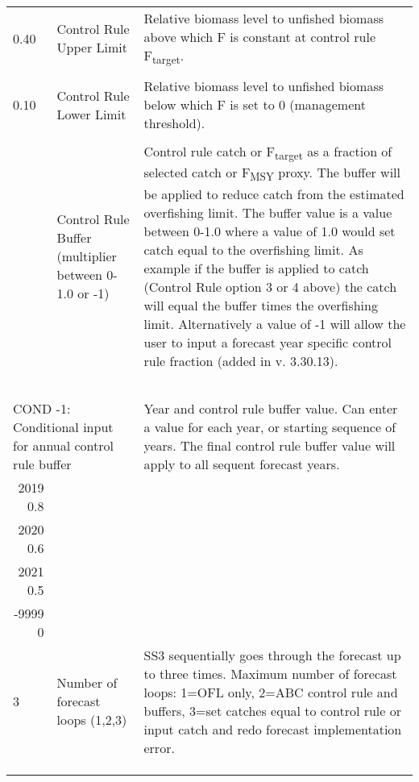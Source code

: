 \begin{landscape}
{\begin{longtable}{p{3.2cm} p{7cm} p{10.8cm}}
 0.40 \Tstrut & Control Rule Upper Limit & \multirow{1}{1cm}[-0.25cm]{\parbox{11cm}{Relative biomass level to unfished biomass above which F is constant at control rule F\textsubscript{target}.}} \\
   &  & \Bstrut\\
 
 \hline
 0.10 \Tstrut & Control Rule Lower Limit & \multirow{1}{1cm}[-0.25cm]{\parbox{11cm}{Relative biomass level to unfished biomass below which F is set to 0 (management threshold).}} \\
   &  & \Bstrut\\
 
 \pagebreak
 0.75 \Tstrut & Control Rule Buffer (multiplier between 0-1.0 or -1) & \multirow{1}{1cm}[-0.25cm]{\parbox{11cm}{Control rule catch or F\textsubscript{target} as a fraction of selected catch or F\textsubscript{MSY} proxy. The buffer will be applied to reduce catch from the estimated overfishing limit. The buffer value is a value between 0-1.0 where a value of 1.0 would set catch equal to the overfishing limit. As example if the buffer is applied to catch (Control Rule option 3 or 4 above) the catch will equal the buffer times the overfishing limit. Alternatively a value of -1 will allow the user to input a forecast year specific control rule fraction (added in v. 3.30.13).}} \\ 
  & & \\
  & & \\
  & & \\
  & & \\
  & & \Bstrut\\
 
 
  \multicolumn{2}{l}{COND -1: Conditional input for annual control rule buffer} & \multirow{1}{1cm}[-0.25cm]{\parbox{11cm}{Year and control rule buffer value. Can enter a value for each year, or starting sequence of years. The final control rule buffer value  will apply to all sequent forecast years.}} \Tstrut\\
  \multicolumn{1}{r}{2019 0.8}  & &  \\
  \multicolumn{1}{r}{2020 0.6}  & & \\ 
  \multicolumn{1}{r}{2021 0.5}  & & \\ 
  \multicolumn{1}{r}{-9999 0}   & & \Bstrut\\ 
  
 \hline
 3 \Tstrut & Number of forecast loops (1,2,3) & \multirow{1}{1cm}[-0.25cm]{\parbox{11cm}{SS3 sequentially goes through the forecast up to three times.  Maximum number of forecast loops: 1=OFL only, 2=ABC control rule and buffers, 3=set catches equal to control rule or input catch and redo forecast implementation error.}} \\
 & & \\
 & & \\
 & & \Bstrut\Bstrut\\
 

\end{longtable}}
\end{landscape}
